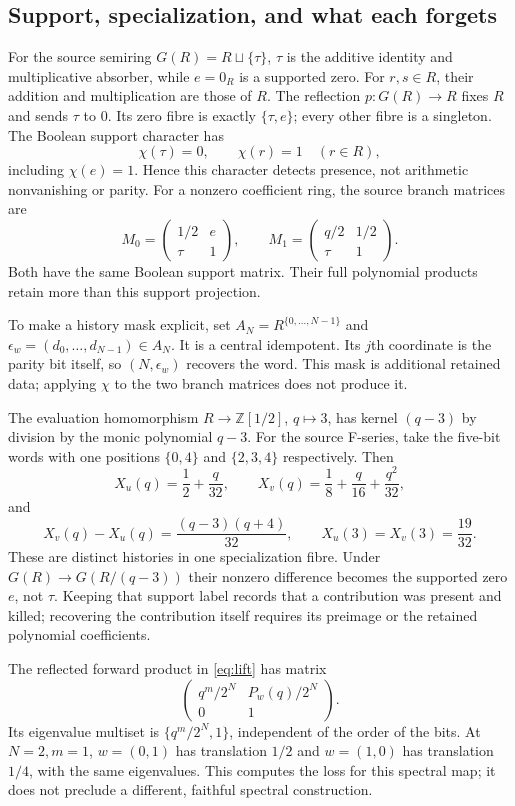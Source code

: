 \documentclass[11pt]{amsart}
\theoremstyle{remark}\newtheorem{remark}[theorem]{Remark}
\newcommand{\Z}{\mathbb Z}
\begin{document}
\subsection{Support, specialization, and what each forgets}
For the source semiring $G(R)=R\sqcup\{\tau\}$, $\tau$ is the additive
identity and multiplicative absorber, while $e=0_R$ is a supported zero.
For $r,s\in R$, their addition and multiplication are those of $R$.
The reflection $p:G(R)\to R$ fixes $R$ and sends $\tau$ to $0$.
Its zero fibre is exactly $\{\tau,e\}$; every other fibre is a singleton.
The Boolean support character has
\[
 \chi(\tau)=0,\qquad \chi(r)=1\quad(r\in R),
\]
including $\chi(e)=1$. Hence this character detects presence, not
arithmetic nonvanishing or parity. For a nonzero coefficient ring, the
source branch matrices are
\[
 M_0=\begin{pmatrix}1/2&e\\\tau&1\end{pmatrix},\qquad
 M_1=\begin{pmatrix}q/2&1/2\\\tau&1\end{pmatrix}.
\]
Both have the same Boolean support matrix. Their full polynomial products
retain more than this support projection.

To make a history mask explicit, set $A_N=R^{\{0,\ldots,N-1\}}$ and
$\epsilon_w=(d_0,\ldots,d_{N-1})\in A_N$. It is a central idempotent.
Its $j$th coordinate is the parity bit itself, so $(N,\epsilon_w)$
recovers the word. This mask is additional retained data; applying $\chi$
to the two branch matrices does not produce it.

The evaluation homomorphism $R\to\Z[1/2]$, $q\mapsto3$, has kernel
$(q-3)$ by division by the monic polynomial $q-3$.
For the source F-series, take the five-bit words with one positions
$\{0,4\}$ and $\{2,3,4\}$ respectively. Then
\[
 X_u(q)=\frac12+\frac q{32},\qquad
 X_v(q)=\frac18+\frac q{16}+\frac{q^2}{32},
\]
and
\[
 X_v(q)-X_u(q)=\frac{(q-3)(q+4)}{32},\qquad
 X_u(3)=X_v(3)=\frac{19}{32}.
\]
These are distinct histories in one specialization fibre.
Under $G(R)\to G(R/(q-3))$ their nonzero difference becomes the
supported zero $e$, not $\tau$. Keeping that support label records
that a contribution was present and killed; recovering the contribution
itself requires its preimage or the retained polynomial coefficients.

The reflected forward product in \eqref{eq:lift} has matrix
\[
 \begin{pmatrix}q^m/2^N&P_w(q)/2^N\\0&1\end{pmatrix}.
\]
Its eigenvalue multiset is $\{q^m/2^N,1\}$, independent of the order
of the bits. At $N=2,m=1$, $w=(0,1)$ has translation $1/2$ and
$w=(1,0)$ has translation $1/4$, with the same eigenvalues. This
computes the loss for this spectral map; it does not preclude a different,
faithful spectral construction.
\end{document}
